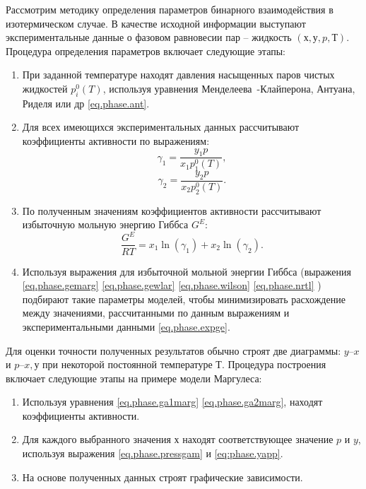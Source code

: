 Рассмотрим методику определения параметров бинарного взаимодействия в изотермическом случае. В качестве исходной информации выступают экспериментальные данные о фазовом равновесии пар – жидкость $(х, у, p, Т)$. Процедура определения параметров включает следующие этапы:
\begin{enumerate}
	\item При заданной температуре находят давления насыщенных паров чистых жидкостей $p_i^0(T)$, используя уравнения Менделеева~-Клайперона, Антуана, Риделя или др \eqref{eq.phase.ant}.
	\item Для всех имеющихся экспериментальных данных рассчитывают коэффициенты активности по выражениям:
	\begin{equation}
		\gamma_1=\dfrac{y_1 p}{x_1 p_1^0(T)},
	\end{equation}
	\begin{equation}
		\gamma_2=\dfrac{y_2 p}{x_2 p_2^0(T)}.
	\end{equation}
	\item По полученным значениям коэффициентов активности рассчитывают избыточную мольную энергию Гиббса $G^E$:
	\begin{equation}\label{eq.phase.expge}
		\dfrac{G^E}{RT}=x_1 \ln(\gamma_1)+x_2 \ln(\gamma_2).
	\end{equation}
	\item Используя  выражения для избыточной мольной энергии Гиббса (выражения \eqref{eq.phase.gemarg} \eqref{eq.phase.gewlar} \eqref{eq.phase.wilson} \eqref{eq.phase.nrtl} ) подбирают такие параметры моделей, чтобы минимизировать расхождение между значениями, рассчитанными по данным выражениям и экспериментальными данными \eqref{eq.phase.expge}.
\end{enumerate}

Для оценки точности полученных результатов обычно строят две диаграммы: $y – x$ и $p – x, у$ при некоторой постоянной температуре $Т$. Процедура построения включает следующие этапы на примере модели Маргулеса:
\begin{enumerate}
\item Используя уравнения \eqref{eq.phase.ga1marg} \eqref{eq.phase.ga2marg}, находят коэффициенты активности.
\item Для каждого выбранного значения $х$ находят соответствующее значение $p$ и $y$, используя выражения \eqref{eq.phase.pressgam} и \eqref{eq:phase.yapp}.
\item На основе полученных данных строят графические зависимости.
\end{enumerate}

